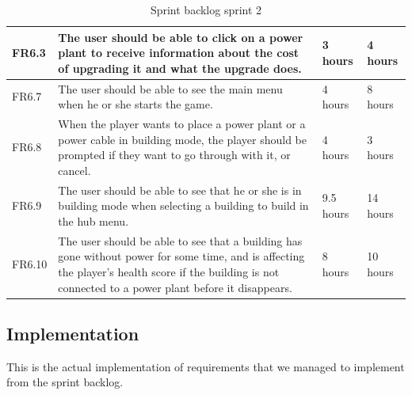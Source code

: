 \begin{table}[H]
\begin{tabular}{| p{1cm} | p{7cm} | p{2cm} | p{2cm} |}
		FR6.3 & The user should be able to click on a power plant to receive information about 
		the cost of upgrading it and what the upgrade does. 
		& 3 hours & 4 hours \\ \hline

		FR6.7 & The user should be able to see the main menu when he or she starts the game. 
		& 4 hours & 8 hours \\ \hline

		FR6.8 & When the player wants to place a power plant or a power cable in building mode, 
		the player should be prompted if they want to go through with it, or cancel. 
		& 4 hours & 3 hours \\ \hline

		FR6.9 & The user should be able to see that he or she is in building mode when selecting 
		a building to build in the hub menu. 
		& 9.5 hours & 14 hours \\ \hline

		FR6.10 & The user should be able to see that a building has gone without power for 
		some time, and is affecting the player's health score if the building is not connected 
		to a power plant before it disappears. 
		& 8 hours & 10 hours \\ \hline
	\end{tabular}
	\caption{Sprint backlog sprint 2}
	\end{table}

\subsection{Implementation}
	
	This is the actual implementation of requirements that we managed to implement
	from the sprint backlog.
	
